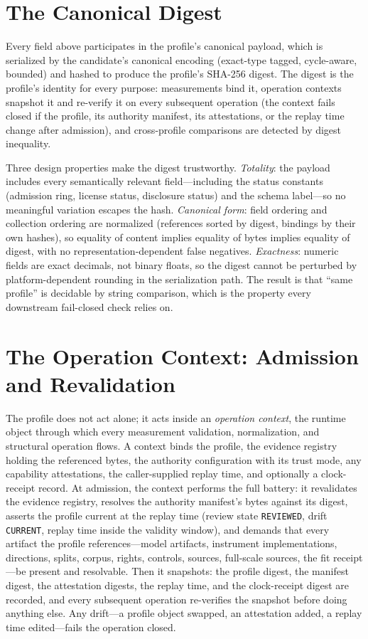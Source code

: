 \section{The Canonical Digest}\label{ch05:digest}

Every field above participates in the profile's canonical payload, which is
serialized by the candidate's canonical encoding (exact-type tagged,
cycle-aware, bounded) and hashed to produce the profile's SHA-256 digest.
The digest is the profile's identity for every purpose: measurements bind
it, operation contexts snapshot it and re-verify it on every subsequent
operation (the context fails closed if the profile, its authority manifest,
its attestations, or the replay time change after admission), and
cross-profile comparisons are detected by digest inequality.

Three design properties make the digest trustworthy. \emph{Totality}: the
payload includes every semantically relevant field---including the status
constants (admission ring, license status, disclosure status) and the
schema label---so no meaningful variation escapes the hash. \emph{Canonical
form}: field ordering and collection ordering are normalized (references
sorted by digest, bindings by their own hashes), so equality of content
implies equality of bytes implies equality of digest, with no
representation-dependent false negatives. \emph{Exactness}: numeric fields
are exact decimals, not binary floats, so the digest cannot be perturbed by
platform-dependent rounding in the serialization path. The result is that
``same profile'' is decidable by string comparison, which is the property
every downstream fail-closed check relies on.

\section{The Operation Context: Admission and Revalidation}\label{ch05:context}

The profile does not act alone; it acts inside an \emph{operation context},
the runtime object through which every measurement validation, normalization,
and structural operation flows. A context binds the profile, the evidence
registry holding the referenced bytes, the authority configuration with its
trust mode, any capability attestations, the caller-supplied replay time,
and optionally a clock-receipt record. At admission, the context performs
the full battery: it revalidates the evidence registry, resolves the
authority manifest's bytes against its digest, asserts the profile current
at the replay time (review state \texttt{REVIEWED}, drift
\texttt{CURRENT}, replay time inside the validity window), and demands that
every artifact the profile references---model artifacts, instrument
implementations, directions, splits, corpus, rights, controls, sources,
full-scale sources, the fit receipt---be present and resolvable. Then it
snapshots: the profile digest, the manifest digest, the attestation digests,
the replay time, and the clock-receipt digest are recorded, and every
subsequent operation re-verifies the snapshot before doing anything else.
Any drift---a profile object swapped, an attestation added, a replay time
edited---fails the operation closed.

